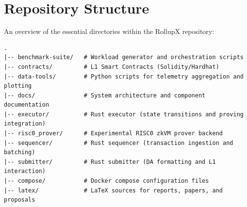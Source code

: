 \chapter{Repository Structure}
\label{app:repo_structure}
An overview of the essential directories within the RollupX repository:
\begin{lstlisting}[style=yamlStyle]
.
|-- benchmark-suite/   # Workload generator and orchestration scripts
|-- contracts/         # L1 Smart Contracts (Solidity/Hardhat)
|-- data-tools/        # Python scripts for telemetry aggregation and plotting
|-- docs/              # System architecture and component documentation
|-- executor/          # Rust executor (state transitions and proving integration)
|-- risc0_prover/      # Experimental RISC0 zkVM prover backend
|-- sequencer/         # Rust sequencer (transaction ingestion and batching)
|-- submitter/         # Rust submitter (DA formatting and L1 interaction)
|-- compose/           # Docker compose configuration files
|-- latex/             # LaTeX sources for reports, papers, and proposals
\end{lstlisting}